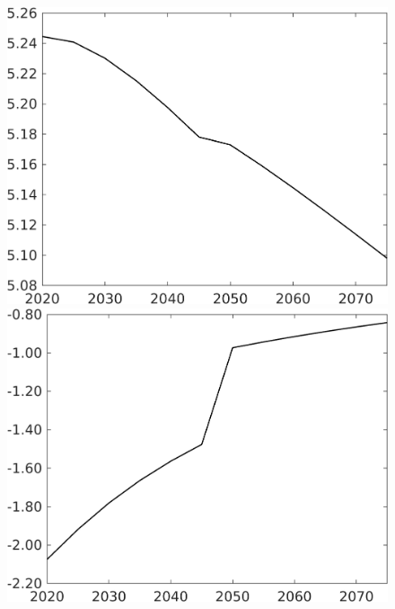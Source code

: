 \documentclass[12pt]{article}
\begin{document}
\begin{figure}[h!!]
\begin{minipage}[]{0.32\textwidth}
	\end{minipage}		
	\begin{minipage}[]{0.32\textwidth}
		\includegraphics[width=1\textwidth]{../../codding_model/own_basedOnFried/optimalPol_010922_revision/figures/all_13Sept22/CompTaufPER_bytaul_Reg0_sff_spillover0_nsk1_xgr0_knspil0_sep1_LFlimit1_emsbase0_countec0_GovRev0_etaa0.79_lgd0.png}
	\end{minipage}		
	\begin{minipage}[]{0.32\textwidth}
		\includegraphics[width=1\textwidth]{../../codding_model/own_basedOnFried/optimalPol_010922_revision/figures/all_13Sept22/CompTaufPER_bytaul_Reg0_sg_spillover0_nsk1_xgr0_knspil0_sep1_LFlimit1_emsbase0_countec0_GovRev0_etaa0.79_lgd0.png}

\end{minipage}
\end{figure}
\end{document}
